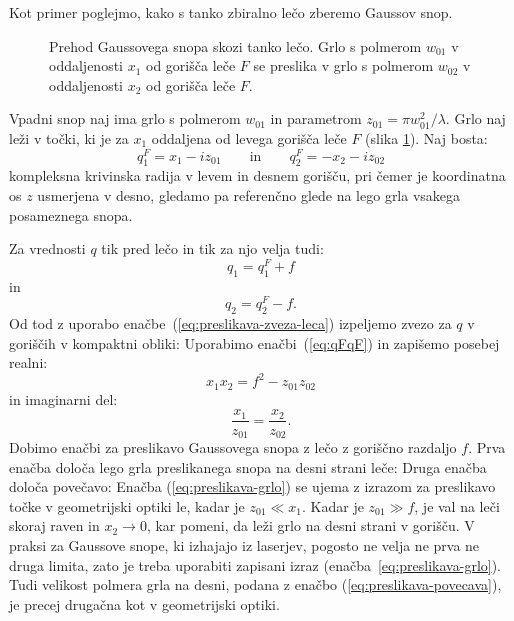 Kot primer poglejmo, kako s tanko zbiralno lečo zberemo Gaussov snop.
\begin{figure}[ht]
\centering
\def\svgwidth{128truemm} 

\caption{Prehod Gaussovega snopa skozi
tanko lečo. Grlo s polmerom $w_{01}$ v oddaljenosti $x_{1}$ od gorišča
leče $F$ se preslika v grlo s polmerom $w_{02}$ v oddaljenosti $x_{2}$ od gorišča
leče $F$.}
\label{fig:Prehod-Gaussovega-snopa}
\end{figure}

Vpadni snop naj ima grlo s polmerom $w_{01}$ in parametrom $z_{01}=\pi w_{01}^2/\lambda$. 
Grlo naj leži v točki, ki je za $x_{1}$ oddaljena od levega gorišča leče $F$ (slika
\ref{fig:Prehod-Gaussovega-snopa}). Naj bosta:
\begin{equation}
q_{1}^{F}=x_{1}-iz_{01} \qquad \mathrm{in} \qquad q_{2}^{F}=-x_{2}-iz_{02}
\label{eq:qFqF}
\end{equation}
 kompleksna krivinska radija v levem in desnem gorišču, pri čemer je koordinatna os $z$ 
 usmerjena v desno, gledamo pa referenčno glede na lego grla vsakega posameznega snopa. 
 
 Za vrednosti $q$ tik pred lečo in tik za njo velja tudi:
\begin{equation}
q_{1}=q_{1}^{F}+f
\end{equation}
in 
\begin{equation}
q_{2}=q_{2}^{F}-f.
\end{equation}
Od tod z uporabo enačbe~(\ref{eq:preslikava-zveza-leca}) izpeljemo zvezo
za $q$ v goriščih v kompaktni obliki:
Uporabimo enačbi~(\ref{eq:qFqF}) in 
zapišemo posebej realni:
\begin{equation}
x_{1}x_{2}=f^{2}-z_{01}z_{02}
\end{equation}
in imaginarni del:
\begin{equation}
\frac{x_{1}}{z_{01}}=\frac{x_{2}}{z_{02}}.
\end{equation}
Dobimo enačbi za preslikavo Gaussovega snopa z lečo z goriščno razdaljo $f$.
Prva enačba določa lego grla preslikanega snopa na desni strani leče:
Druga enačba določa povečavo:
Enačba (\ref{eq:preslikava-grlo}) se ujema z izrazom za preslikavo točke v geometrijski
optiki le, kadar je $z_{01}\ll x_{1}$. Kadar je $z_{01}\gg f$, je
val na leči skoraj raven in $x_2 \to 0$, kar pomeni, da leži
grlo na desni strani v gorišču. V praksi za Gaussove snope, ki izhajajo iz laserjev, pogosto ne
velja ne prva ne druga limita, zato je treba uporabiti zapisani izraz 
(enačba~\ref{eq:preslikava-grlo}).
Tudi velikost polmera grla na desni, podana z enačbo (\ref{eq:preslikava-povecava}),
je precej drugačna kot v geometrijski optiki.

